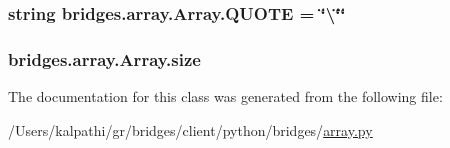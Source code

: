 \subsubsection[{Q\+U\+O\+T\+E}]{\setlength{\rightskip}{0pt plus 5cm}string bridges.\+array.\+Array.\+Q\+U\+O\+T\+E = \char`\"{}\textbackslash{}\char`\"{}\char`\"{}\hspace{0.3cm}{\ttfamily [static]}}\label{classbridges_1_1array_1_1_array_a8777c1e64d0566b38f049d4fb04b0217}
\hypertarget{classbridges_1_1array_1_1_array_aeac1b1639d0284500f354d41b40c38f7}{}
\subsubsection[{size}]{\setlength{\rightskip}{0pt plus 5cm}bridges.\+array.\+Array.\+size}\label{classbridges_1_1array_1_1_array_aeac1b1639d0284500f354d41b40c38f7}


The documentation for this class was generated from the following file\+:\begin{DoxyCompactItemize}
\item 
/\+Users/kalpathi/gr/bridges/client/python/bridges/\hyperlink{array_8py}{array.\+py}\end{DoxyCompactItemize}
